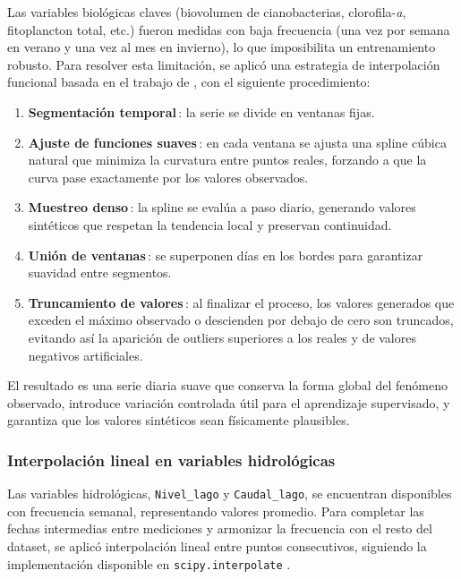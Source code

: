\documentclass[
  11pt,
  pdftitle=TFI - Tschopp Joaquín S.,
  pdfauthor=Tschopp Joaquín S.,
  pdfcreator=LaTeX with hyperref,
]{report}  %
\begin{document}
Las variables biológicas claves (biovolumen de cianobacterias, clorofila-\textit{a}, fitoplancton total, etc.) fueron medidas con baja frecuencia (una vez por semana en verano y una vez al mes en invierno), lo que imposibilita un entrenamiento robusto. Para resolver esta limitación, se aplicó una estrategia de interpolación funcional basada en el trabajo de \citep{Oh2020}, con el siguiente procedimiento:


\begin{enumerate}[noitemsep]
  \item \textbf{Segmentación temporal}\,: la serie se divide en ventanas fijas.
  \item \textbf{Ajuste de funciones suaves}\,: en cada ventana se ajusta una spline cúbica natural que minimiza la curvatura entre puntos reales, forzando a que la curva pase exactamente por los valores observados.
  \item \textbf{Muestreo denso}\,: la spline se evalúa a paso diario, generando valores sintéticos que respetan la tendencia local y preservan continuidad.
  \item \textbf{Unión de ventanas}\,: se superponen días en los bordes para garantizar suavidad entre segmentos.
  \item \textbf{Truncamiento de valores}\,: al finalizar el proceso, los valores generados que exceden el máximo observado o descienden por debajo de cero son truncados, evitando así la aparición de outliers superiores a los reales y de valores negativos artificiales.
\end{enumerate}

El resultado es una serie diaria suave que conserva la forma global del fenómeno observado, introduce variación controlada útil para el aprendizaje supervisado, y garantiza que los valores sintéticos sean físicamente plausibles.


\subsubsection{Interpolación lineal en variables hidrológicas}

Las variables hidrológicas, \texttt{Nivel\_lago} y \texttt{Caudal\_lago}, se encuentran disponibles con frecuencia semanal, representando valores promedio. Para completar las fechas intermedias entre mediciones y armonizar la frecuencia con el resto del dataset, se aplicó interpolación lineal entre puntos consecutivos, siguiendo la implementación disponible en \texttt{scipy.interpolate} \citep{virtanen2020scipy}.
\end{document}
